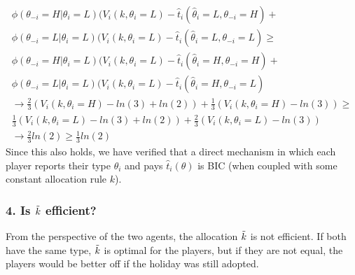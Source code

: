 \documentclass[a4paper]{article}
\begin{document}
	\begin{align}
		\phi(\theta_{-i}=H|\theta_{i}=L)(V_{i}(k,\theta_{i}=L)-\hat{t}_{i}(\hat{\theta}_{i}=L,\theta_{-i}=H) + \nonumber \\\phi(\theta_{-i}=L|\theta_{i}=L)(V_{i}(k,\theta_{i}=L)-\hat{t}_{i}(\hat{\theta}_{i}=L,\theta_{-i}=L) \geq \nonumber\\
		\phi(\theta_{-i}=H|\theta_{i}=L)(V_{i}(k,\theta_{i}=L)-\hat{t}_{i}(\hat{\theta}_{i}=H,\theta_{-i}=H) + \nonumber \\\phi(\theta_{-i}=L|\theta_{i}=L)(V_{i}(k,\theta_{i}=L)-\hat{t}_{i}(\hat{\theta}_{i}=H,\theta_{-i}=L)\\
		\rightarrow \frac{2}{3}(V_{i}(k,\theta_{i}=H)-ln(3)+ln(2))+\frac{1}{3}(V_{i}(k,\theta_{i}=H)-ln(3)) \geq \nonumber\\ \frac{1}{3}(V_{i}(k,\theta_{i}=L)-ln(3)+ln(2))+\frac{2}{3}(V_{i}(k,\theta_{i}=L)-ln(3))\\
		\rightarrow \frac{2}{3}ln(2) \geq \frac{1}{3}ln(2)
	\end{align}
	Since this also holds, we have verified that a direct mechanism in which each player reports their type $\theta_{i}$ and pays $\hat{t}_{i}(\theta)$ is BIC (when
	coupled with some constant allocation rule $k$).
	
	
	
	\subsubsection*{4. Is $\Tilde{k}$ efficient?}
	From the perspective of the two agents, the allocation $\Tilde{k}$ is not efficient. If both have the same type, $\Tilde{k}$ is optimal for the players, but if they are not equal, the players would be better off if the holiday was still adopted. 
	
	
\end{document}
